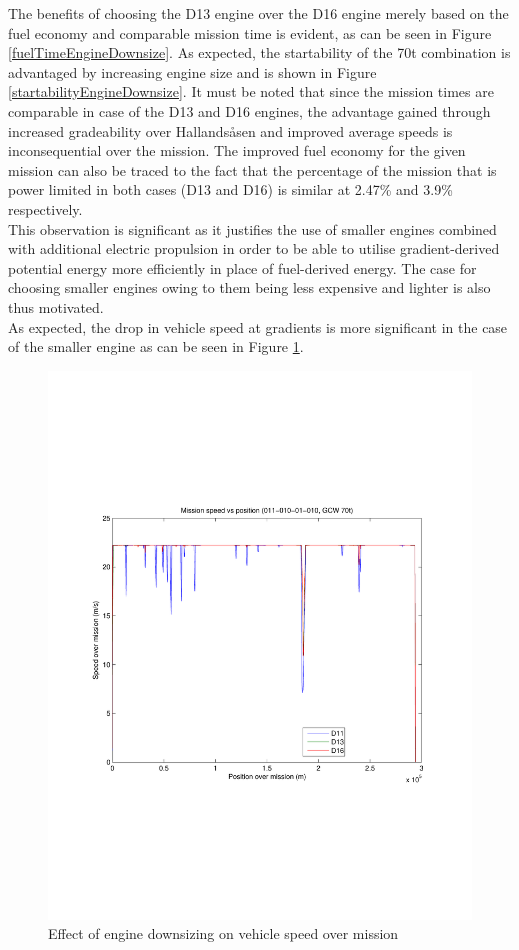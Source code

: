 \documentclass{article}
\begin{document}
The benefits of choosing the D13 engine over the D16 engine merely based on the fuel economy and comparable mission time is evident, as can be seen in Figure \ref{fuelTimeEngineDownsize}. As expected, the startability of the 70t combination is advantaged by increasing engine size and is shown in Figure \ref{startabilityEngineDownsize}. It must be noted that since the mission times are comparable in case of the D13 and D16 engines, the advantage gained through increased gradeability over Hallands\aa sen and improved average speeds is inconsequential over the mission. The improved fuel economy for the given mission can also be traced to the fact that the percentage of the mission that is power limited in both cases (D13 and D16)  is similar at 2.47\% and 3.9\% respectively.\\

This observation is significant as it justifies the use of smaller engines combined with additional electric propulsion in order to be able to utilise gradient-derived potential energy more efficiently in place of fuel-derived energy. The case for choosing smaller engines owing to them being less expensive and lighter is also thus motivated.\\

As expected, the drop in vehicle speed at gradients is more significant in the case of the smaller engine as can be seen in Figure \ref{speedEngineDownsizing}.\\

\begin{figure}[h!]
\centering
\includegraphics[width=0.8\linewidth, clip=true, trim=45 185 65 208]{Figures/Engine_downsizing/Mission_speed_vs_position_(011-010-01-010,GCW_70t).pdf}
\caption{Effect of engine downsizing on vehicle speed over mission}
\label{speedEngineDownsizing}
\end{figure}
\end{document}
